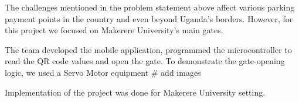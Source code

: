 The challenges mentioned in the problem statement above affect various parking payment points in the country and even beyond Uganda's borders. However, for this project we focused on Makerere University's main gates.

The team developed the mobile application, programmed the microcontroller to read the QR code values and open the gate. To demonstrate the gate-opening logic, we used a Servo Motor equipment
# add images

Implementation of the project was done for  Makerere University setting.

